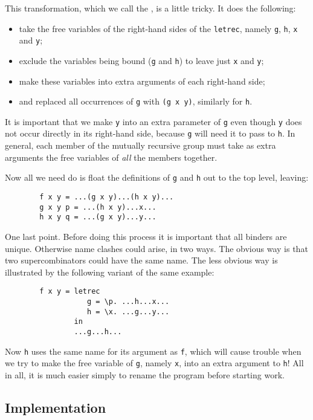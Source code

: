 This transformation, which we call the , is
a little tricky.  It does the following:
\begin{itemize}
\item
take the free variables of the right-hand sides of the \mbox{\tt letrec},
namely \mbox{\tt g}, \mbox{\tt h}, \mbox{\tt x} and \mbox{\tt y};
\item
exclude the variables being bound (\mbox{\tt g} and
\mbox{\tt h}) to leave just \mbox{\tt x} and \mbox{\tt y};
\item
make these variables into extra arguments
of each right-hand side;
\item
and replaced all occurrences of \mbox{\tt g} with \mbox{\tt (g\ x\ y)},
similarly for \mbox{\tt h}.
\end{itemize}
It is important that we make \mbox{\tt y} into an extra parameter of \mbox{\tt g} even
though \mbox{\tt y} does not occur directly in its right-hand side, because \mbox{\tt g}
will need it to pass to \mbox{\tt h}.  In general, each member of the
mutually recursive group must take as extra arguments the free
variables of {\em all\/} the members together.

Now all we need do is float the definitions of \mbox{\tt g} and \mbox{\tt h} out to the
top level, leaving:
\begin{verbatim}
        f x y = ...(g x y)...(h x y)...
        g x y p = ...(h x y)...x...
        h x y q = ...(g x y)...y...
\end{verbatim}

One last point. Before doing this process it is important that all
binders are unique.  Otherwise name clashes could arise, in two ways.
The obvious way is that two supercombinators could have the same name.
The less obvious way is illustrated by the following variant of the
same example:
\begin{verbatim}
        f x y = letrec
                   g = \p. ...h...x...
                   h = \x. ...g...y...
                in
                ...g...h...
\end{verbatim}
Now \mbox{\tt h} uses the same name for its argument as \mbox{\tt f}, which will cause
trouble when we try to make the free variable of \mbox{\tt g}, namely \mbox{\tt x}, into
an extra argument to \mbox{\tt h}!  All in all, it is much easier simply to
rename the program before starting work.

\subsection{Implementation}

